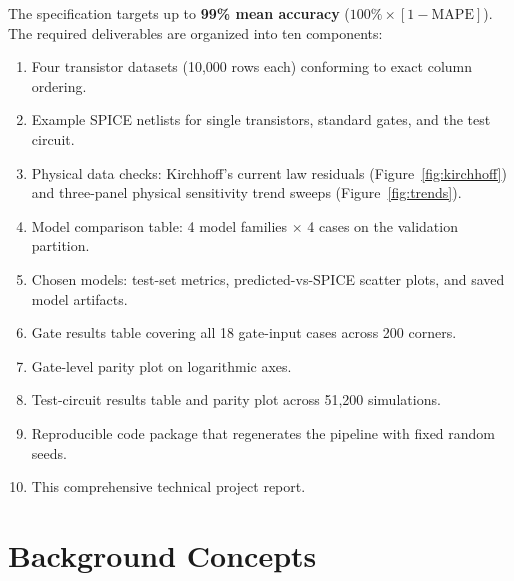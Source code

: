 \documentclass[11pt,a4paper]{article}
\numberwithin{table}{section}
\numberwithin{figure}{section}
\begin{document}
The specification targets up to \textbf{99\% mean accuracy} ($100\% \times [1 - \mathrm{MAPE}]$). The required deliverables are organized into ten components:
\begin{enumerate}[noitemsep]
    \item Four transistor datasets (10,000 rows each) conforming to exact column ordering.
    \item Example SPICE netlists for single transistors, standard gates, and the test circuit.
    \item Physical data checks: Kirchhoff's current law residuals (Figure~\ref{fig:kirchhoff}) and three-panel physical sensitivity trend sweeps (Figure~\ref{fig:trends}).
    \item Model comparison table: 4 model families $\times$ 4 cases on the validation partition.
    \item Chosen models: test-set metrics, predicted-vs-SPICE scatter plots, and saved model artifacts.
    \item Gate results table covering all 18 gate-input cases across 200 corners.
    \item Gate-level parity plot on logarithmic axes.
    \item Test-circuit results table and parity plot across 51,200 simulations.
    \item Reproducible code package that regenerates the pipeline with fixed random seeds.
    \item This comprehensive technical project report.
\end{enumerate}

\section{Background Concepts}
\end{document}
